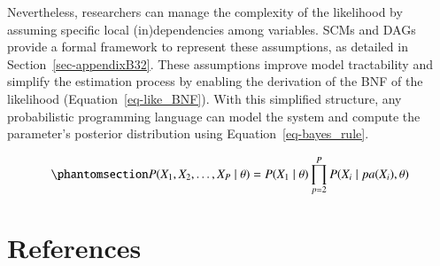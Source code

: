 \documentclass[
  authoryear,
  review,
  1p]{elsarticle}
\begin{document}
Nevertheless, researchers can manage the complexity of the likelihood by
assuming specific local (in)dependencies among variables. SCMs and DAGs
provide a formal framework to represent these assumptions, as detailed
in Section~\ref{sec-appendixB32}. These assumptions improve model
tractability and simplify the estimation process by enabling the
derivation of the BNF of the likelihood (Equation~\ref{eq-like_BNF}).
With this simplified structure, any probabilistic programming language
can model the system and compute the parameter's posterior distribution
using Equation~\ref{eq-bayes_rule}.

\begin{equation}\protect\phantomsection\label{eq-like_BNF}{
P(X_{1}, X_{2}, \dots, X_{P} \mid \theta) = P(X_{1} \mid \theta) \prod^{P}_{p=2} P(X_{i} \mid pa(X_{i}), \theta )
}\end{equation}

\newpage{}

\section*{References}\label{references}

\renewcommand{\bibsection}{}

\end{document}
